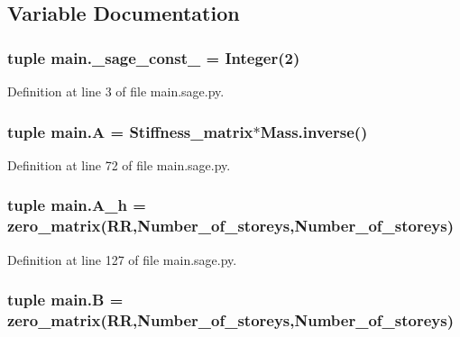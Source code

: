 \subsection{Variable Documentation}
\hypertarget{namespacemain_ad85d7913c0e40b9e1f30e64611a0fafa}{}
\subsubsection[{\+\_\+sage\+\_\+const\+\_\+2}]{\setlength{\rightskip}{0pt plus 5cm}tuple main.\+\_\+sage\+\_\+const\+\_ = Integer(2)}\label{namespacemain_ad85d7913c0e40b9e1f30e64611a0fafa}


Definition at line 3 of file main.\+sage.\+py.

\hypertarget{namespacemain_ad101f166a53497f04b37636bcadbfe65}{}
\subsubsection[{A}]{\setlength{\rightskip}{0pt plus 5cm}tuple main.\+A = {\bf Stiffness\+\_\+matrix}$\ast$Mass.\+inverse()}\label{namespacemain_ad101f166a53497f04b37636bcadbfe65}


Definition at line 72 of file main.\+sage.\+py.

\hypertarget{namespacemain_a49b10c1530f56b101c4cc17b20fb1973}{}
\subsubsection[{A\+\_\+h}]{\setlength{\rightskip}{0pt plus 5cm}tuple main.\+A\+\_\+h = zero\+\_\+matrix(R\+R,Number\+\_\+of\+\_\+storeys,Number\+\_\+of\+\_\+storeys)}\label{namespacemain_a49b10c1530f56b101c4cc17b20fb1973}


Definition at line 127 of file main.\+sage.\+py.

\hypertarget{namespacemain_a6ae8768d11174f5baf9febc5244d6f06}{}
\subsubsection[{B}]{\setlength{\rightskip}{0pt plus 5cm}tuple main.\+B = zero\+\_\+matrix(R\+R,Number\+\_\+of\+\_\+storeys,Number\+\_\+of\+\_\+storeys)}\label{namespacemain_a6ae8768d11174f5baf9febc5244d6f06}


